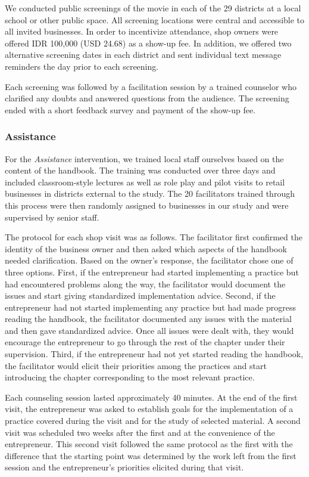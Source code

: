 \documentclass[11.5pt]{article}
\begin{document}
We conducted public screenings of the movie in each of the 29 districts at a local school or other public space. All screening locations were central and accessible to all invited businesses. In order to incentivize attendance, shop owners were offered IDR 100,000 (USD 24.68) as a show-up fee. In addition, we offered two alternative screening dates in each district and sent individual text message reminders the day prior to each screening.

Each screening was followed by a facilitation session by a trained counselor who clarified any doubts and answered questions from the audience. The screening ended with a short feedback survey and payment of the show-up fee. \\

\subsubsection{Assistance}

For the \emph{Assistance} intervention, we trained local staff ourselves based on the content of the handbook. The training was conducted over three days and included classroom-style lectures as well as role play and pilot visits to retail businesses in districts external to the study. The 20 facilitators trained through this process were then randomly assigned to businesses in our study and were supervised by senior staff.

The protocol for each shop visit was as follows. The facilitator first confirmed the identity of the business owner and then asked which aspects of the handbook needed clarification. Based on the owner's response, the facilitator chose one of three options. First, if the entrepreneur had started implementing a practice but had encountered problems along the way, the facilitator would document the issues and start giving standardized implementation advice. Second, if the entrepreneur had not started implementing any practice but had made progress reading the handbook, the facilitator documented any issues with the material and then gave standardized advice. Once all issues were dealt with, they would encourage the entrepreneur to go through the rest of the chapter under their supervision. Third, if the entrepreneur had not yet started reading the handbook, the facilitator would elicit their priorities among the practices and start introducing the chapter corresponding to the most relevant practice.

Each counseling session lasted approximately 40 minutes. At the end of the first visit, the entrepreneur was asked to establish goals for the implementation of a practice covered during the visit and for the study of selected material. A second visit was scheduled two weeks after the first and at the convenience of the entrepreneur. This second visit followed the same protocol as the first with the difference that the starting point was determined by the work left from the first session and the entrepreneur's priorities elicited during that visit.   \\
\end{document}
